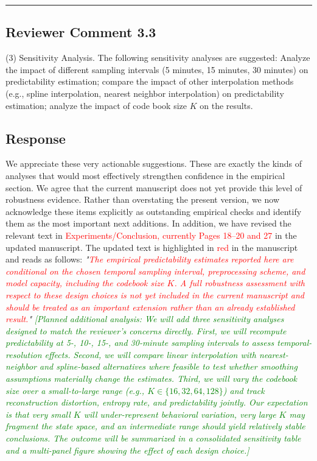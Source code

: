 \documentclass{NSF}
\begin{document}
\noindent\rule{16.5cm}{1.0pt}

\subsection{Reviewer Comment 3.3}
\begin{mdframed}
(3) Sensitivity Analysis. The following sensitivity analyses are suggested: Analyze the impact of different sampling intervals (5 minutes, 15 minutes, 30 minutes) on predictability estimation; compare the impact of other interpolation methods (e.g., spline interpolation, nearest neighbor interpolation) on predictability estimation; analyze the impact of code book size $K$ on the results.
\end{mdframed}
\subsection{Response}
We appreciate these very actionable suggestions. These are exactly the kinds of analyses that would most effectively strengthen confidence in the empirical section. We agree that the current manuscript does not yet provide this level of robustness evidence. Rather than overstating the present version, we now acknowledge these items explicitly as outstanding empirical checks and identify them as the most important next additions.
\noindent In addition, we have revised the relevant text in \textcolor{red}{Experiments/Conclusion, currently Pages 18--20 and 27} in the updated manuscript. The updated text is highlighted in \textcolor{red}{red} in the manuscript and reads as follows:
\vskip 0.1cm
\noindent \textit{"\textcolor{red}{The empirical predictability estimates reported here are conditional on the chosen temporal sampling interval, preprocessing scheme, and model capacity, including the codebook size $K$. A full robustness assessment with respect to these design choices is not yet included in the current manuscript and should be treated as an important extension rather than an already established result.}"}
\vskip 0.05in
\noindent\textcolor{green}{\textit{[Planned additional analysis: We will add three sensitivity analyses designed to match the reviewer's concerns directly. First, we will recompute predictability at 5-, 10-, 15-, and 30-minute sampling intervals to assess temporal-resolution effects. Second, we will compare linear interpolation with nearest-neighbor and spline-based alternatives where feasible to test whether smoothing assumptions materially change the estimates. Third, we will vary the codebook size over a small-to-large range (e.g., $K \in \{16, 32, 64, 128\}$) and track reconstruction distortion, entropy rate, and predictability jointly. Our expectation is that very small $K$ will under-represent behavioral variation, very large $K$ may fragment the state space, and an intermediate range should yield relatively stable conclusions. The outcome will be summarized in a consolidated sensitivity table and a multi-panel figure showing the effect of each design choice.]}}
\end{document}
